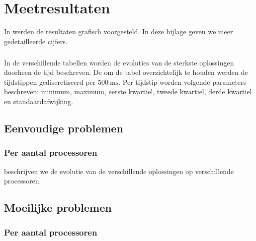 \chapter{Meetresultaten}

In  werden de resultaten grafisch voorgesteld. In deze bijlage geven we meer gedetailleerde cijfers.

\paragraph{}
In de verschillende tabellen worden de evoluties van de sterkste oplossingen doorheen de tijd beschreven. De om de tabel overzichtelijk te houden werden de tijdstippen gediscretiseerd per $500~\mbox{ms}$. Per tijdstip worden volgende parameters beschreven: minimum, maximum, eerste kwartiel, tweede kwartiel, derde kwartiel en standaardafwijking.

\section{Eenvoudige problemen}

\subsection{Per aantal processoren}


 beschrijven we de evolutie van de verschillende oplossingen op verschillende processoren.

\section{Moeilijke problemen}

\subsection{Per aantal processoren}